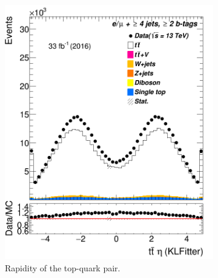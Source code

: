 \begin{figure}
\begin{subfigure}{0.35\textwidth}
		\includegraphics[width=\linewidth]{ControlPlots_emujets_2016_4incl_2incl/klf_ttbar_eta_emujets_2016.png}
		\caption{Rapidity of the top-quark pair.} \label{fig:30}
	\end{subfigure}
	\medskip
	\begin{subfigure}{0.35\textwidth}

\end{subfigure}
\end{figure}
